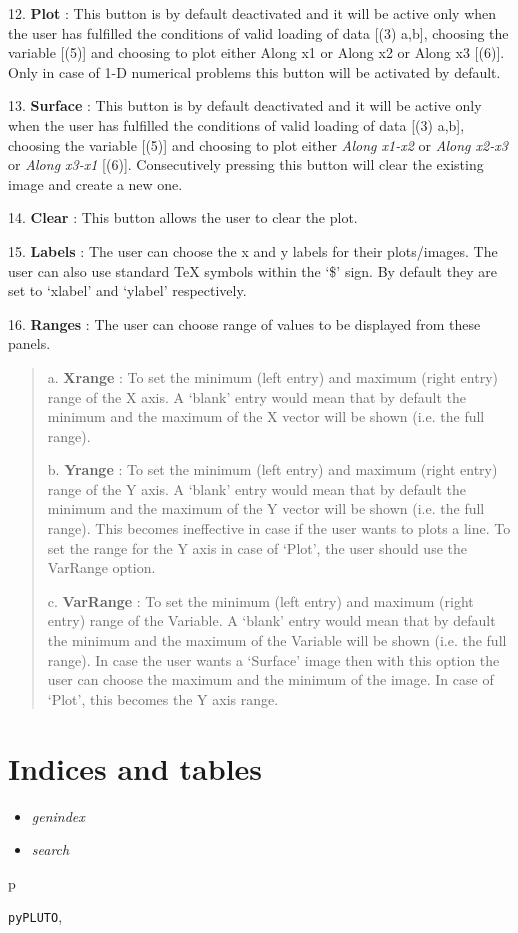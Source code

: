 \documentclass[letterpaper,10pt,english]{sphinxmanual}
\begin{document}
12. \textbf{Plot} : This button is by default deactivated and it will be active only when the user has fulfilled the conditions of valid
loading of data {[}(3) a,b{]}, choosing the variable {[}(5){]} and choosing to
plot either Along x1 or Along x2 or Along x3 {[}(6){]}.  Only in case of
1-D numerical problems this button will be activated by default.

13. \textbf{Surface} : This button is by default deactivated and it will be
active only when the user has fulfilled the conditions of valid
loading of data {[}(3) a,b{]}, choosing the variable {[}(5){]} and choosing to
plot either \emph{Along x1-x2} or \emph{Along x2-x3} or \emph{Along x3-x1}
{[}(6){]}. Consecutively pressing this button will clear the existing
image and create a new one.

14. \textbf{Clear} : This button allows the user to
clear the plot.

15. \textbf{Labels} : The user can choose the x and y labels for
their plots/images. The user can also use standard TeX symbols within
the `\$' sign. By default they are set to `xlabel' and `ylabel' respectively.

16. \textbf{Ranges} : The user can choose range of values to be displayed
from these panels.
\begin{quote}

a. \textbf{Xrange} : To set the minimum (left entry) and maximum (right
entry) range of the X axis. A `blank' entry would mean that by
default the minimum and the maximum of the X vector will be shown (i.e. the full range).

b. \textbf{Yrange} : To set the minimum (left entry) and maximum (right
entry) range of the Y axis. A `blank' entry would mean that by default the minimum and the maximum of the Y
vector will be shown (i.e. the full range). This becomes
ineffective in case if the user wants to plots a line. To set the
range for the Y axis in case of `Plot', the user should use the
VarRange option.

c. \textbf{VarRange} : To set the minimum (left entry) and maximum
(right entry) range of the Variable. A `blank' entry
would mean that by default the minimum and the maximum of the Variable
will be shown (i.e. the full range). In case the user wants a
`Surface' image then with this option the user can choose the
maximum and the minimum of the image. In case of `Plot', this
becomes the Y axis range.
\end{quote}


\chapter{Indices and tables}
\label{index:indices-and-tables}\begin{itemize}
\item {} 
\emph{genindex}

\item {} 
\emph{search}

\end{itemize}


\renewcommand{\indexname}{Python Module Index}
\begin{theindex}
\def\bigletter#1{{\Large\sffamily#1}\nopagebreak\vspace{1mm}}
\bigletter{p}
\item {\texttt{pyPLUTO}}, \pageref{index:module-pyPLUTO}
\end{theindex}

\renewcommand{\indexname}{Index}
\printindex
\end{document}
